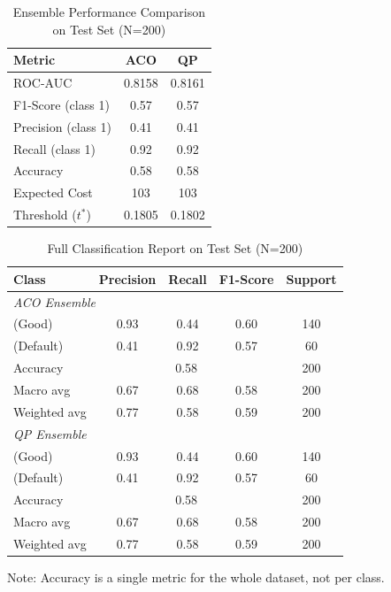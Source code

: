 \documentclass[12pt,a4paper]{article}
\begin{document}
\begin{table}[H]
\centering
\caption{Ensemble Performance Comparison on Test Set (N=200)}
\label{tab:results}
\begin{tabular}{lcc}
\toprule
\textbf{Metric} & \textbf{ACO} & \textbf{QP} \\
\midrule
ROC-AUC            & 0.8158  & 0.8161  \\
F1-Score (class 1) & 0.57    & 0.57    \\
Precision (class 1)& 0.41    & 0.41    \\
Recall (class 1)   & 0.92    & 0.92    \\
Accuracy           & 0.58    & 0.58    \\
Expected Cost      & 103     & 103     \\
\midrule
Threshold ($t^*$)  & 0.1805  & 0.1802  \\
\bottomrule
\end{tabular}
\end{table}

\begin{table}[H]
\centering
\caption{Full Classification Report on Test Set (N=200)}
\label{tab:classreport}
\begin{tabular}{lcccc}
\toprule
\textbf{Class} & \textbf{Precision} & \textbf{Recall} & \textbf{F1-Score} & \textbf{Support} \\
\midrule
\multicolumn{5}{l}{\textit{ACO Ensemble}} \\
\quad 0 (Good)     & 0.93 & 0.44 & 0.60 & 140 \\
\quad 1 (Default)  & 0.41 & 0.92 & 0.57 & 60  \\
\quad Accuracy     & \multicolumn{3}{c}{0.58} & 200 \\
\quad Macro avg    & 0.67 & 0.68 & 0.58 & 200 \\
\quad Weighted avg & 0.77 & 0.58 & 0.59 & 200 \\
\midrule
\multicolumn{5}{l}{\textit{QP Ensemble}} \\
\quad 0 (Good)     & 0.93 & 0.44 & 0.60 & 140 \\
\quad 1 (Default)  & 0.41 & 0.92 & 0.57 & 60  \\
\quad Accuracy     & \multicolumn{3}{c}{0.58} & 200 \\
\quad Macro avg    & 0.67 & 0.68 & 0.58 & 200 \\
\quad Weighted avg & 0.77 & 0.58 & 0.59 & 200 \\
\bottomrule
\end{tabular}
\end{table}
\text Note: Accuracy is a single metric for the whole dataset, not per class.
\end{document}
